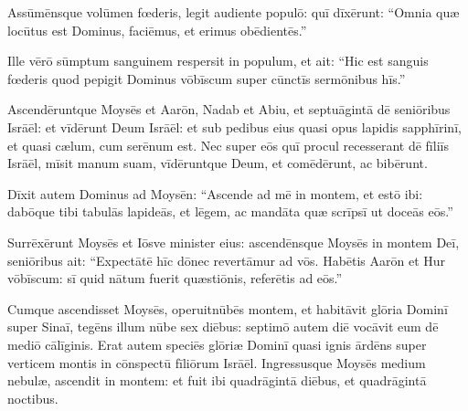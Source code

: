 Assūmēnsque volūmen fœderis, legit audiente populō: quī
dīxērunt: ``Omnia quæ locūtus est Dominus, faciēmus, et erimus
obēdientēs.''

Ille vērō sūmptum sanguinem
respersit in populum, et ait: ``Hic est sanguis fœderis quod
pepigit Dominus vōbīscum super cūnctīs sermōnibus hīs.''

Ascendēruntque Moysēs et Aarōn, Nadab et Abiu, et septuāgintā dē seniōribus
Isrāēl: 
et vīdērunt Deum Isrāēl: et sub pedibus eius quasi opus
lapidis sapphīrinī, et quasi cælum, cum serēnum est. 
Nec
super eōs quī procul recesserant dē fīliīs Isrāēl, mīsit manum suam,
vīdēruntque Deum, et comēdērunt, ac
bibērunt. 

Dīxit autem Dominus ad Moysēn: ``As\-cende ad mē
in montem, et estō ibi: dabōque tibi tabulās lapideās, et lēgem, ac mandāta quæ scrīpsī ut doceās eōs.''

Surrēxērunt Moysēs et Iōsve minister eius: ascendēnsque Moysēs in montem
Deī, 
seniōribus ait: ``Expectātē hīc dōnec revertāmur ad
vōs. Habētis Aarōn et Hur vōbīscum: sī quid nātum fuerit
quæstiōnis, referētis ad eōs.''

Cumque ascendisset Moysēs,
operuit\linebreak nūbēs montem, 
et habitāvit glōria Dominī super Sinaī, tegēns
illum nūbe sex diēbus: septimō autem diē vocāvit eum dē mediō
cālīginis. 
Erat autem speciēs glōriæ Dominī quasi ignis
ārdēns super verticem montis in cōnspectū fīliōrum Isrāēl. 
Ingressusque Moysēs medium nebulæ,
ascendit in montem: et fuit ibi quadrāgintā diēbus, et quadrāgintā
noctibus.
